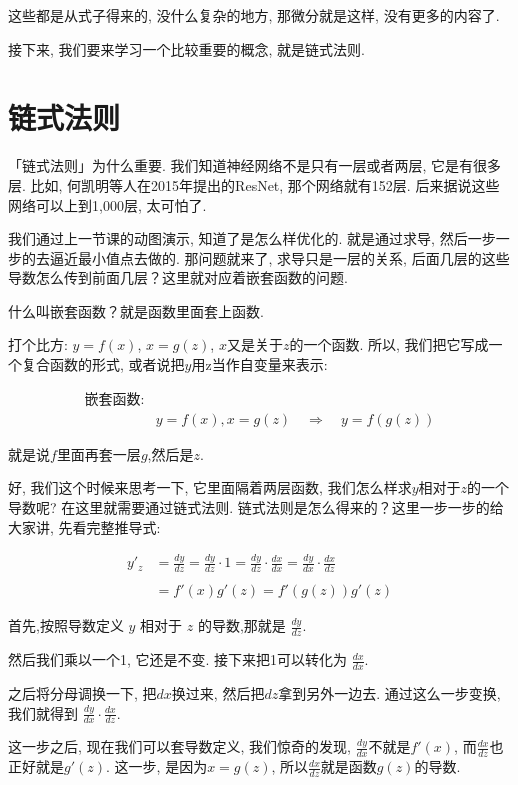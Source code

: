 这些都是从式子得来的, 没什么复杂的地方, 那微分就是这样, 没有更多的内容了. 

接下来, 我们要来学习一个比较重要的概念, 就是链式法则. 

\section{链式法则}

「链式法则」为什么重要. 我们知道神经网络不是只有一层或者两层, 它是有很多层. 比如, 何凯明等人在2015年提出的ResNet, 那个网络就有152层. 后来据说这些网络可以上到1,000层, 太可怕了. 

我们通过上一节课的动图演示, 知道了是怎么样优化的. 就是通过求导, 然后一步一步的去逼近最小值点去做的. 那问题就来了, 求导只是一层的关系, 后面几层的这些导数怎么传到前面几层？这里就对应着嵌套函数的问题. 

什么叫嵌套函数？就是函数里面套上函数. 

打个比方: $y=f(x)$, $x=g(z)$, $x$又是关于$z$的一个函数. 所以, 我们把它写成一个复合函数的形式, 或者说把$y$用z当作自变量来表示:

\begin{align*}
  \mbox{嵌套函数:}& \\
  & y = f(x), x = g(z) \quad \Rightarrow \quad y = f(g(z))
\end{align*}

就是说$f$里面再套一层$g$,然后是$z$. 

好, 我们这个时候来思考一下, 它里面隔着两层函数, 我们怎么样求$y$相对于$z$的一个导数呢? 在这里就需要通过链式法则. 链式法则是怎么得来的？这里一步一步的给大家讲, 先看完整推导式:

\begin{align*}
  y'_z & = \frac{dy}{dz} = \frac{dy}{dz} \cdot 1 = \frac{dy}{dz} \cdot \frac{dx}{dx} = \frac{dy}{dx} \cdot \frac{dx}{dz} \\ \\
  & = f'(x)g'(z) = f'(g(z))g'(z)
\end{align*}

首先,按照导数定义 $y$ 相对于 $z$ 的导数,那就是 $\frac{dy}{dz}$.

然后我们乘以一个1, 它还是不变. 接下来把1可以转化为 $\frac{dx}{dx}$. 

之后将分母调换一下, 把$dx$换过来, 然后把$dz$拿到另外一边去. 通过这么一步变换, 我们就得到 $\frac{dy}{dx} \cdot \frac{dx}{dz}$. 

这一步之后, 现在我们可以套导数定义, 我们惊奇的发现, $\frac{dy}{dx}$不就是$f'(x)$, 而$\frac{dx}{dz}$也正好就是$g'(z)$. 这一步, 是因为$x=g(z)$, 所以$\frac{dx}{dz}$就是函数$g(z)$的导数. 

